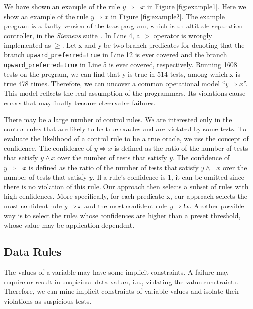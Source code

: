 \documentclass{sig-alternate}
\newcommand{\CodeIn}[1]{{\small\texttt{#1}}}
\begin{document}
We have shown an example of the rule $y\Rightarrow \neg x$ in Figure
\ref{fig:example1}. Here we show an example of the rule
$y\Rightarrow x$ in Figure \ref{fig:example2}. The example program
is a faulty version of the tcas program, which is an altitude
separation controller, in the \emph{Siemens}
suite~\cite{Hutchins94}. In Line 4, a $>$ operator is wrongly
implemented as $\ge$. Let x and y be two branch predicates for
denoting that the branch \CodeIn{upward\_preferred=true} in Line 12
is ever covered and the branch \CodeIn{upward\_preferred=true} in
Line 5 is ever covered, respectively. Running 1608 tests on the
program, we can find that y is true in 514 tests, among which x is
true 478 times. Therefore, we can uncover a common operational model
``$y\Rightarrow x$''. This model reflects the real assumption of the
programmers. Its violations cause errors that may finally become
observable failures.



There may be a large number of control rules. We are interested only
in the control rules that are likely to be true oracles and are
violated by some tests. To evaluate the likelihood of a control rule
to be a true oracle, we use the concept of confidence. The
confidence of $y\Rightarrow x$ is defined as the ratio of the number
of tests that satisfy $y\wedge x$ over the number of tests that
satisfy $y$. The confidence of $y\Rightarrow \neg x$ is defined as
the ratio of the number of tests that satisfy $y\wedge \neg x$ over
the number of tests that satisfy $y$. If a rule's confidence is 1,
it can be omitted since there is no violation of this rule. Our
approach then selects a subset of rules with high confidences. More
specifically, for each predicate x, our approach selects the most
confident rule $y\Rightarrow x$ and the most confident rule
$y\Rightarrow !x$. Another possible way is to select the rules whose
confidences are higher than a preset threshold, whose value may be
application-dependent.





\subsection{Data Rules}

The values of a variable may have some implicit constraints. A
failure may require or result in suspicious data values, i.e.,
violating the value constraints. Therefore, we can mine implicit
constraints of variable values and isolate their violations as
suspicious tests.
\end{document}
